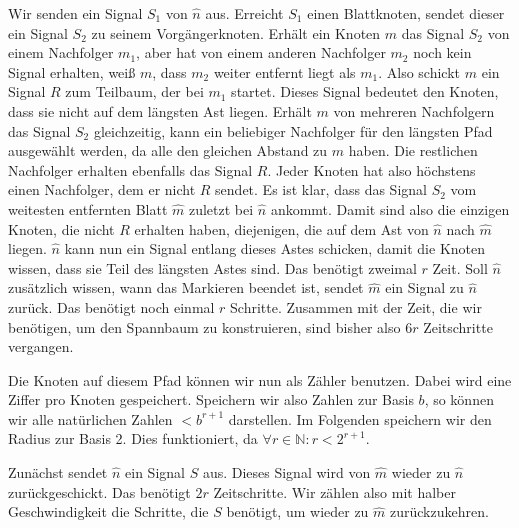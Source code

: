 \documentclass[11pt]{article}
\begin{document}
Wir senden ein Signal $S_1$ von $\hat{n}$ aus. Erreicht $S_1$ einen Blattknoten, sendet dieser ein Signal $S_2$ zu seinem Vorgängerknoten. 
Erhält ein Knoten $m$ das Signal $S_2$ von einem Nachfolger $m_1$, aber hat von einem anderen Nachfolger $m_2$ noch kein Signal erhalten, weiß $m$, dass $m_2$ weiter entfernt liegt als $m_1$. 
Also schickt $m$ ein Signal $R$ zum Teilbaum, der bei $m_1$ startet. Dieses Signal bedeutet den Knoten, dass sie nicht auf dem längsten Ast liegen. 
Erhält $m$  von mehreren Nachfolgern das Signal $S_2$ gleichzeitig, kann ein beliebiger Nachfolger für den längsten Pfad ausgewählt werden, da alle den gleichen Abstand zu $m$ haben. 
Die restlichen Nachfolger erhalten ebenfalls das Signal $R$. 
Jeder Knoten hat also höchstens einen Nachfolger, dem er nicht $R$ sendet. 
Es ist klar, dass das Signal $S_2$ vom weitesten entfernten Blatt $\hat{m}$ zuletzt bei $\hat{n}$ ankommt. 
Damit sind also die einzigen Knoten, die nicht $R$ erhalten haben, diejenigen, die auf dem Ast von $\hat{n}$ nach $\hat{m}$ liegen.
$\hat{n}$ kann nun ein Signal entlang dieses Astes schicken, damit die Knoten wissen, dass sie Teil des längsten Astes sind.
Das benötigt zweimal $r$ Zeit. Soll $\hat{n}$ zusätzlich wissen, wann das Markieren beendet ist, sendet $\hat{m}$ ein Signal zu $\hat{n}$ zurück. Das benötigt noch einmal $r$ Schritte.
Zusammen mit der Zeit, die wir benötigen, um den Spannbaum zu konstruieren, sind bisher also $6r$ Zeitschritte vergangen.

Die Knoten auf diesem Pfad können wir nun als Zähler benutzen.
Dabei wird eine Ziffer pro Knoten gespeichert. Speichern wir also Zahlen zur Basis $b$, so können wir alle natürlichen Zahlen $< b^{r+1}$ darstellen. Im Folgenden speichern wir den Radius zur Basis 2. Dies funktioniert, da $\forall r \in \mathbb{N} : r < 2^{r+1}$.

Zunächst sendet $\hat{n}$ ein Signal $S$ aus. Dieses Signal wird von $\hat{m}$ wieder zu $\hat{n}$ zurückgeschickt. Das benötigt $2r$ Zeitschritte. Wir zählen also mit halber Geschwindigkeit die Schritte, die $S$ benötigt, um wieder zu $\hat{m}$ zurückzukehren.
\end{document}
